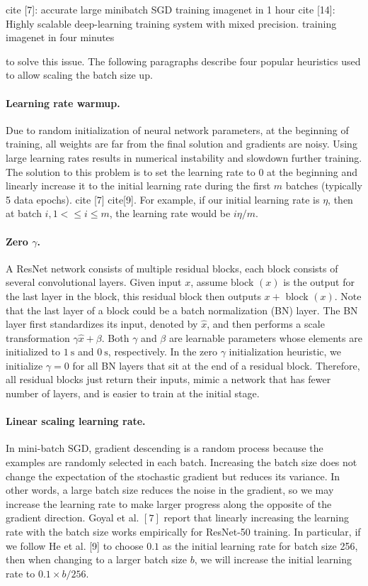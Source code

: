 cite [7]: accurate large minibatch SGD training imagenet in 1 hour
cite [14]: Highly scalable deep-learning training system with mixed precision. training imagenet in four minutes

to solve this issue. The following paragraphs describe four popular heuristics used to allow scaling the batch size up. 

\paragraph{Learning rate warmup.}
Due to random initialization of neural network parameters, at the beginning of training, all weights are far from the final solution and gradients are noisy. Using large learning rates results in numerical instability and slowdown further training. The solution to this problem is to set the learning rate to 0 at the beginning and linearly increase it to the initial learning rate during the first $m$ batches (typically 5 data epochs). cite [7] cite[9]. For example, if our initial learning rate is $\eta$, then at batch $i, 1 < \leq i \leq m$, the learning rate would be $ i \eta / m$.

\paragraph{Zero $\gamma$.} %
A ResNet network consists of multiple residual blocks, each block consists of several convolutional layers. Given input $x$, assume block $(x)$ is the output for the last layer in the block, this residual block then outputs $x+$ block $(x)$. Note that the last layer of a block could be a batch normalization (BN) layer. The BN layer first standardizes its input, denoted by $\hat{x}$, and then performs a scale transformation $\gamma \hat{x}+\beta .$ Both $\gamma$ and $\beta$ are learnable parameters whose elements are initialized to $1 \mathrm{~s}$ and $0 \mathrm{~s}$, respectively. In the zero $\gamma$ initialization heuristic, we initialize $\gamma=0$ for all BN layers that sit at the end of a residual block. Therefore, all residual blocks just return their inputs, mimic a network that has fewer number of layers, and is easier to train at the initial stage.

\paragraph{Linear scaling learning rate.}
In mini-batch SGD, gradient descending is a random process because the examples are randomly selected in each batch. Increasing the batch size does not change the expectation of the stochastic gradient but reduces its variance. In other words, a large batch size reduces the noise in the gradient, so we may increase the learning rate to make larger progress along the opposite of the gradient direction. Goyal et al. $[7]$ report that linearly increasing the learning rate with the batch size works empirically for ResNet-50 training. In particular, if we follow He et al. [9] to choose $0.1$ as the initial learning rate for batch size 256, then when changing to a larger batch size $b$, we will increase the initial learning rate to $0.1 \times b / 256 .$

